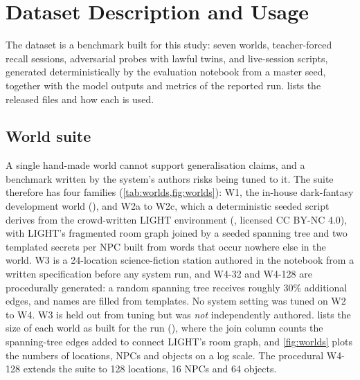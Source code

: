 \documentclass[letterpaper,journal,onecolumn]{IEEEtran}
\begin{document}
\section{Dataset Description and Usage}\label{sec:dataset-ext}

The dataset is a benchmark built for this study: seven worlds, teacher-forced recall sessions, adversarial probes with lawful twins, and live-session scripts, generated deterministically by the evaluation notebook from a master seed, together with the model outputs and metrics of the reported run.  lists the released files and how each is used.

\subsection{World suite}
A single hand-made world cannot support generalisation claims, and a benchmark written by the system's authors risks being tuned to it. The suite therefore has four families (\cref{tab:worlds,fig:worlds}): W1, the in-house dark-fantasy development world (), and W2a to W2c, which a deterministic seeded script derives from the crowd-written LIGHT environment \cite{urbanek2019light} (\href{https://dl.fbaipublicfiles.com/parlai/light/light-environment.pkl}{}, licensed CC BY-NC 4.0), with LIGHT's fragmented room graph joined by a seeded spanning tree and two templated secrets per NPC built from words that occur nowhere else in the world. W3 is a 24-location science-fiction station authored in the notebook from a written specification before any system run, and W4-32 and W4-128 are procedurally generated: a random spanning tree receives roughly 30\% additional edges, and names are filled from templates. No system setting was tuned on W2 to W4. W3 is held out from tuning but was \emph{not} independently authored.  lists the size of each world as built for the run (), where the join column counts the spanning-tree edges added to connect LIGHT's room graph, and \cref{fig:worlds} plots the numbers of locations, NPCs and objects on a log scale. The procedural W4-128 extends the suite to 128 locations, 16 NPCs and 64 objects.
\end{document}
